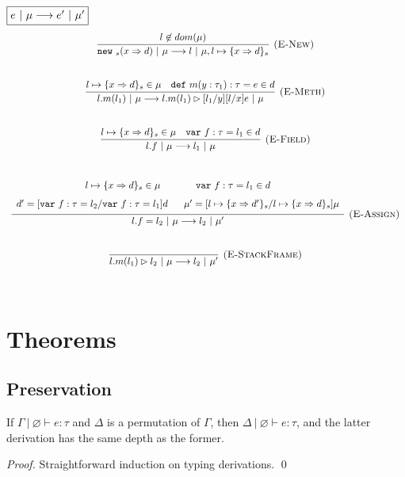\documentclass{llncs}
\newcommand{\keywadj}[1]{\mathtt{#1}}
\newcommand{\keyw}[1]{\keywadj{#1}~}
\begin{document}
$\fbox{$e~|~\mu \longrightarrow e'~|~\mu'$}$
\[
\begin{array}{c}
\infer[\textsc{(E-New)}]
  {\keyw{new}_{s}(x \Rightarrow d)~|~\mu \longrightarrow l~|~\mu, l \mapsto \{ x \Rightarrow d \}_{s}}
  {l \not\in dom(\mu)}\\[5ex]
  
\infer[\textsc{(E-Meth)}]
  {l.m(l_1)~|~\mu \longrightarrow l.m(l_1) \rhd [l_1/y][l/x]e~|~\mu}
  {l \mapsto \{ x \Rightarrow d \}_{s} \in \mu & \keyw{def} m(y : \tau_1) : \tau = e \in d}\\[5ex]

\infer[\textsc{(E-Field)}]
  {l.f~|~\mu \longrightarrow l_1~|~\mu}
  {l \mapsto \{ x \Rightarrow d \}_{s} \in \mu & \keyw{var} f:\tau = l_1 \in d}\\[5ex]

\infer[\textsc{(E-Assign)}]
  {l.f = l_2~|~\mu \longrightarrow l_2~|~\mu'}
  {\def\arraystretch{1.6}
  \begin{array}{c}
l \mapsto \{ x \Rightarrow d \}_{s} \in \mu~~~~~~~~~~~\keyw{var} f:\tau = l_1 \in d \\
d' = [\keyw{var} f:\tau = l_2/\keyw{var} f:\tau = l_1]d~~~~~\mu' = [l \mapsto \{ x \Rightarrow d' \}_{s}/l \mapsto \{ x \Rightarrow d \}_{s}]\mu
  \end{array}}\\[5ex]


\infer[\textsc{(E-StackFrame)}]
  {l.m(l_1) \rhd l_2~|~\mu \longrightarrow l_2~|~\mu'}
  {}\\[5ex]
  
\end{array}
\]

\newpage

\section{Theorems}

\subsection{Preservation}

\begin{lemma}[Permutation]
If $\Gamma~|~\varnothing \vdash e : \tau$ and $\Delta$ is a permutation of $\Gamma$, then $\Delta~|~\varnothing \vdash e : \tau$, and the latter derivation has the same depth as the former.
\end{lemma}

\begin{proof}
Straightforward induction on typing derivations. \qed
\end{proof}
\end{document}
